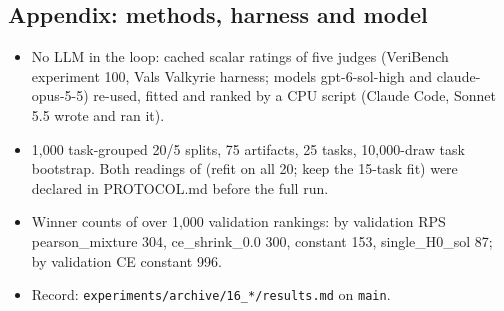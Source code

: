 \subsection*{Appendix: methods, harness and model}
\begin{itemize}
  \item No LLM in the loop: cached scalar ratings of five judges (VeriBench experiment 100, Vals Valkyrie harness; models gpt-6-sol-high and claude-opus-5-5) re-used, fitted and ranked by a CPU script (Claude Code, Sonnet 5.5 wrote and ran it).
  \item 1,000 task-grouped 20/5 splits, 75 artifacts, 25 tasks, 10,000-draw task bootstrap. Both readings of  (refit on all 20; keep the 15-task fit) were declared in PROTOCOL.md before the full run.
  \item Winner counts of  over 1,000 validation rankings: by validation RPS pearson\_mixture 304, ce\_shrink\_0.0 300, constant 153, single\_H0\_sol 87; by validation CE constant 996.
  \item Record: \texttt{experiments/archive/16\_*/results.md} on \texttt{main}.
\end{itemize}
